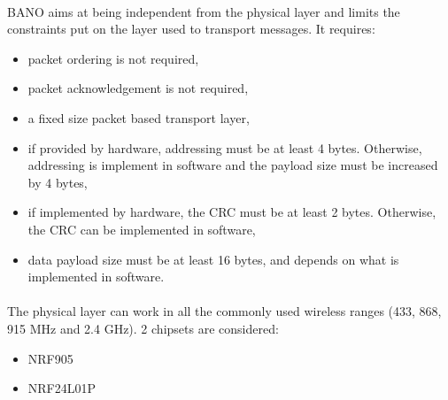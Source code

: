 \documentclass[a4paper, 11pt]{article}
\begin{document}
\paragraph{}
BANO aims at being independent from the physical layer and limits the
constraints put on the layer used to transport messages. It requires:
\begin{itemize}
\item packet ordering is not required,
\item packet acknowledgement is not required,
\item a fixed size packet based transport layer,
\item if provided by hardware, addressing must be at least 4 bytes.
Otherwise, addressing is implement in software and the payload size must be
increased by 4 bytes,
\item if implemented by hardware, the CRC must be at least 2 bytes. Otherwise,
the CRC can be implemented in software,
\item data payload size must be at least 16 bytes, and depends on what is
implemented in software.
\end{itemize}

\paragraph{}
The physical layer can work in all the commonly used wireless ranges (433, 868,
915 MHz and 2.4 GHz). 2 chipsets are considered:
\begin{itemize}
\item NRF905
\item NRF24L01P
\end{itemize}


\end{document}
